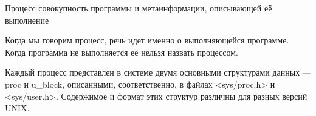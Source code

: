\begin{defi}{Процесс}
	совокупность программы и метаинформации, описывающей её выполнение
\end{defi}

Когда мы говорим процесс, речь идет именно о выполняющейся программе. Когда программа не выполняется её нельзя назвать процессом.

Каждый процесс представлен в системе двумя основными структурами данных — proc и u\_block, описанными, соответственно, в файлах <sys/proc.h> и <sys/user.h>. Содержимое и формат этих структур различны для разных версий UNIX.
